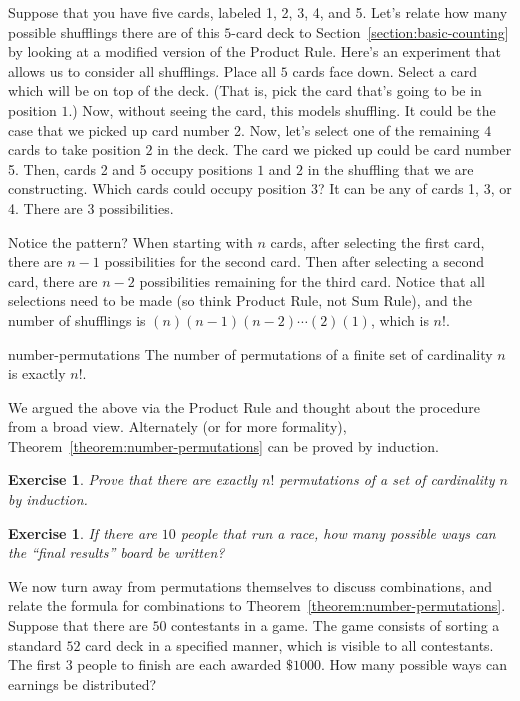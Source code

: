 \documentclass{book}
\newcounter{ekcounter}%
\theoremstyle{ekimcustom}
\newtheorem{exercise}[ekcounter]{Exercise}
\begin{document}
Suppose that you have five cards, labeled 1, 2, 3, 4, and 5. Let's relate how many possible shufflings there are of this $5$-card deck to Section~\ref{section:basic-counting} by looking at a modified version of the Product Rule. Here's an experiment that allows us to consider all shufflings. Place all $5$ cards face down. Select a card which will be on top of the deck. (That is, pick the card that's going to be in position $1$.) Now, without seeing the card, this models shuffling. It could be the case that we picked up card number 2. Now, let's select one of the remaining $4$ cards to take position $2$ in the deck. The card we picked up could be card number 5. Then, cards 2 and 5 occupy positions $1$ and $2$ in the shuffling that we are constructing. Which cards could occupy position $3$? It can be any of cards 1, 3, or 4. There are $3$ possibilities.

Notice the pattern? When starting with $n$ cards, after selecting the first card, there are $n-1$ possibilities for the second card. Then after selecting a second card, there are $n-2$ possibilities remaining for the third card. Notice that all selections need to be made (so think Product Rule, not Sum Rule), and the number of shufflings is $(n)(n-1)(n-2) \cdots (2)(1)$, which is $n!$. 

\begin{btheorem}{}{number-permutations}
The number of permutations of a finite set of cardinality $n$ is exactly $n!$.
\end{btheorem}

We argued the above via the Product Rule and thought about the procedure from a broad view. Alternately (or for more formality), Theorem~\ref{theorem:number-permutations} can be proved by induction.
\begin{exercise}
Prove that there are exactly $n!$ permutations of a set of cardinality $n$ by induction.
\end{exercise}

\begin{exercise}
If there are $10$ people that run a race, how many possible ways can the ``final results'' board be written?
\end{exercise}

We now turn away from permutations themselves to discuss combinations, and relate the formula for combinations to Theorem~\ref{theorem:number-permutations}. Suppose that there are $50$ contestants in a game. The game consists of sorting a standard $52$ card deck in a specified manner, which is visible to all contestants. The first $3$ people to finish are each awarded $\$1000$. How many possible ways can earnings be distributed?
\end{document}
